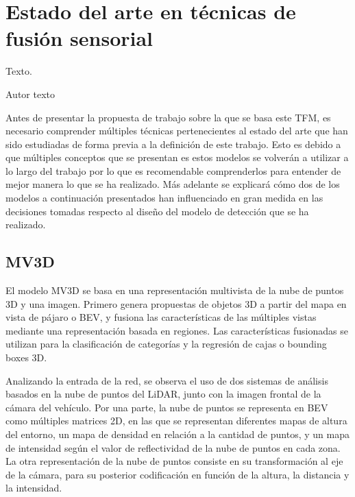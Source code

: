 \chapter{Estado del arte en técnicas de fusión sensorial}
\label{cha:Estado del arte en técnicas de fusión sensorial}

\begin{FraseCelebre}
  \begin{Frase}
    Texto.
  \end{Frase}
  \begin{Fuente}
    Autor texto
  \end{Fuente}
\end{FraseCelebre}

\noindent
Antes de presentar la propuesta de trabajo sobre la que se basa este TFM, es necesario comprender múltiples técnicas pertenecientes al estado del arte que han sido estudiadas de forma previa a la definición de este trabajo. Esto es debido a que múltiples conceptos que se presentan es estos modelos se volverán a utilizar a lo largo del trabajo por lo que es recomendable comprenderlos para entender de mejor manera lo que se ha realizado. Más adelante se explicará cómo dos de los modelos a continuación presentados han influenciado en gran medida en las decisiones tomadas respecto al diseño del modelo de detección que se ha realizado.

\section{MV3D}
\label{sec:MV3D}

El modelo \ac{MV3D} \cite{MV3D} se basa en una representación multivista de la nube de puntos 3D y una imagen. Primero genera propuestas de objetos 3D a partir del mapa en vista de pájaro o \ac{BEV}, y fusiona las características de las múltiples vistas mediante una representación basada en regiones. Las características fusionadas se utilizan para la clasificación de categorías y la regresión de cajas o bounding boxes 3D.

Analizando la entrada de la red, se observa el uso de dos sistemas de análisis basados en la nube de puntos del \ac{LiDAR}, junto con la imagen frontal de la cámara del vehículo. Por una parte, la nube de puntos se representa en \ac{BEV} como múltiples matrices 2D, en las que se representan diferentes mapas de altura del entorno, un mapa de densidad en relación a la cantidad de puntos, y un mapa de intensidad según el valor de reflectividad de la nube de puntos en cada zona. La otra representación de la nube de puntos consiste en su transformación al eje de la cámara, para su posterior codificación en función de la altura, la distancia y la intensidad.

